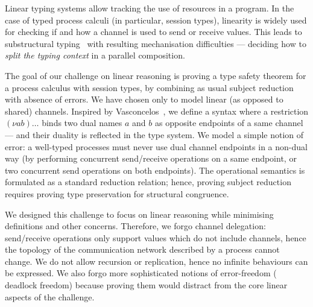 \documentclass[runningheads]{llncs}
\begin{document}

Linear typing systems allow  tracking the use of resources in a program. In
the case of typed process calculi (in particular, session types), linearity is
widely used for checking if and how a channel is used to send or receive values.
This leads to substructural typing~\cite[Chapter 1]{Pierce2004-oq} with
resulting mechanisation difficulties --- \eg deciding how to \emph{split the
typing context} in a parallel composition.

The goal of our challenge on linear reasoning is proving a type safety theorem
for a process calculus with session types, by combining as usual subject
reduction with absence of errors.  We have chosen  only to model linear (as
opposed to shared) channels. Inspired by Vasconcelos~\cite{Vasconcelos2012}, we
define a syntax where a restriction $(\nu ab)\ldots$ binds two dual names $a$
and $b$ as opposite endpoints of a same channel --- and their duality is
reflected in the type system. We model a simple notion of error: a well-typed
processes must never use dual channel endpoints in a non-dual way (\eg by
performing concurrent send/receive operations on a same endpoint, or two
concurrent send operations on both endpoints).
The operational semantics is formulated as a standard reduction relation; hence,
proving subject reduction requires proving type preservation for structural
congruence.

We designed this challenge to focus on linear reasoning while minimising
definitions and other concerns.  Therefore, we forgo channel delegation:
send/receive operations only support values which do not include channels, hence
the topology of the communication network described by a process cannot change.
We do not allow recursion or replication, hence no infinite behaviours can be
expressed. We also forgo more sophisticated notions of error-freedom (\eg
deadlock freedom) because proving them would distract from the core linear
aspects of the challenge.
\end{document}
